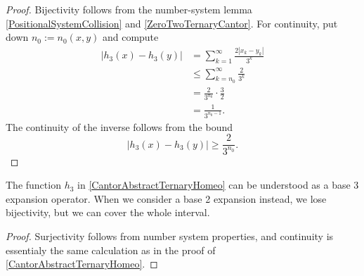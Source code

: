 \begin{proof}
    Bijectivity follows from the number-system lemma \ref{PositionalSystemCollision} and \ref{ZeroTwoTernaryCantor}. For continuity, put down \( n_0 := n_0(x,y) \) and compute
    \begin{align*}
        \left| h_3(x) - h_3(y) \right| &= \sum_{k=1}^\infty \frac{2|x_k - y_k|}{3^k} \\
                                   &\leqslant \sum_{k = n_0}^\infty \frac{2}{3^k} \\
                                   &= \frac{2}{3^{n_0}} \cdot \frac{3}{2} \\
                                   &= \frac{1}{3^{n_0 - 1}}.
    \end{align*}
    The continuity of the inverse follows from the bound
    \[ 
        \left| h_3(x) - h_3(y) \right| \geqslant \frac{2}{3^{n_0}}.
   \]
\end{proof}

The function \( h_3 \) in \ref{CantorAbstractTernaryHomeo} can be understood as a base 3 expansion operator. When we consider a base 2 expansion instead, we lose bijectivity, but we can cover the whole interval.

\begin{proof}
    Surjectivity follows from number system properties, and continuity is essentialy the same calculation as in the proof of \ref{CantorAbstractTernaryHomeo}.
\end{proof}


